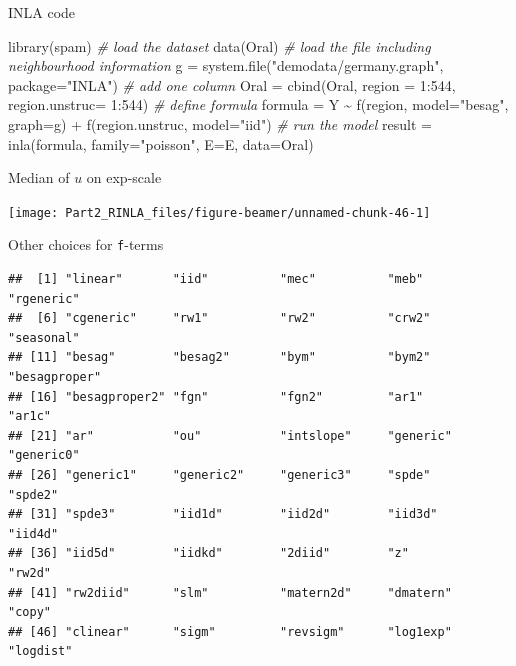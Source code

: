 \documentclass[
  ignorenonframetext,
]{beamer}
\newenvironment{Shaded}{\begin{snugshade}}{\end{snugshade}}
\newcommand{\AttributeTok}[1]{\textcolor[rgb]{0.77,0.63,0.00}{#1}}
\newcommand{\CommentTok}[1]{\textcolor[rgb]{0.56,0.35,0.01}{\textit{#1}}}
\newcommand{\DecValTok}[1]{\textcolor[rgb]{0.00,0.00,0.81}{#1}}
\newcommand{\FunctionTok}[1]{\textcolor[rgb]{0.00,0.00,0.00}{#1}}
\newcommand{\NormalTok}[1]{#1}
\newcommand{\OtherTok}[1]{\textcolor[rgb]{0.56,0.35,0.01}{#1}}
\newcommand{\SpecialCharTok}[1]{\textcolor[rgb]{0.00,0.00,0.00}{#1}}
\newcommand{\StringTok}[1]{\textcolor[rgb]{0.31,0.60,0.02}{#1}}
\begin{document}
\begin{frame}[fragile]{INLA code}
\protect\hypertarget{inla-code}{}
\begin{Shaded}
\begin{Highlighting}[]
\FunctionTok{library}\NormalTok{(spam)}
\CommentTok{\# load the dataset}
\FunctionTok{data}\NormalTok{(Oral)}
\CommentTok{\# load the file including neighbourhood information}
\NormalTok{g }\OtherTok{=} \FunctionTok{system.file}\NormalTok{(}\StringTok{"demodata/germany.graph"}\NormalTok{, }\AttributeTok{package=}\StringTok{"INLA"}\NormalTok{)}
\CommentTok{\# add one column }
\NormalTok{Oral }\OtherTok{=} \FunctionTok{cbind}\NormalTok{(Oral, }\AttributeTok{region =} \DecValTok{1}\SpecialCharTok{:}\DecValTok{544}\NormalTok{, }\AttributeTok{region.unstruc=} \DecValTok{1}\SpecialCharTok{:}\DecValTok{544}\NormalTok{)}
\CommentTok{\# define formula}
\NormalTok{formula }\OtherTok{=}\NormalTok{ Y }\SpecialCharTok{\textasciitilde{}} \FunctionTok{f}\NormalTok{(region, }\AttributeTok{model=}\StringTok{"besag"}\NormalTok{, }\AttributeTok{graph=}\NormalTok{g) }\SpecialCharTok{+}
                           \FunctionTok{f}\NormalTok{(region.unstruc, }\AttributeTok{model=}\StringTok{"iid"}\NormalTok{)}
\CommentTok{\# run the model}
\NormalTok{result }\OtherTok{=} \FunctionTok{inla}\NormalTok{(formula, }\AttributeTok{family=}\StringTok{"poisson"}\NormalTok{, }\AttributeTok{E=}\NormalTok{E, }\AttributeTok{data=}\NormalTok{Oral)}
\end{Highlighting}
\end{Shaded}
\end{frame}

\begin{frame}{Median of \(u\) on exp-scale}
\protect\hypertarget{median-of-u-on-exp-scale}{}
\small

\begin{center}\texttt{[image: Part2\_RINLA\_files/figure-beamer/unnamed-chunk-46-1]} \end{center}
\end{frame}

\begin{frame}[fragile]{Other choices for \texttt{f}-terms}
\protect\hypertarget{other-choices-for-f-terms}{}
\small

\begin{verbatim}
##  [1] "linear"       "iid"          "mec"          "meb"          "rgeneric"    
##  [6] "cgeneric"     "rw1"          "rw2"          "crw2"         "seasonal"    
## [11] "besag"        "besag2"       "bym"          "bym2"         "besagproper" 
## [16] "besagproper2" "fgn"          "fgn2"         "ar1"          "ar1c"        
## [21] "ar"           "ou"           "intslope"     "generic"      "generic0"    
## [26] "generic1"     "generic2"     "generic3"     "spde"         "spde2"       
## [31] "spde3"        "iid1d"        "iid2d"        "iid3d"        "iid4d"       
## [36] "iid5d"        "iidkd"        "2diid"        "z"            "rw2d"        
## [41] "rw2diid"      "slm"          "matern2d"     "dmatern"      "copy"        
## [46] "clinear"      "sigm"         "revsigm"      "log1exp"      "logdist"
\end{verbatim}
\end{frame}
\end{document}
